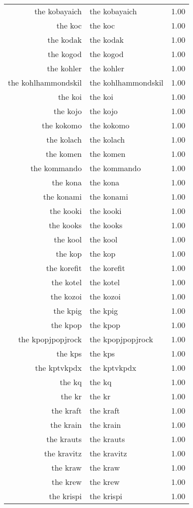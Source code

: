 \begin{table}[ht]
\begin{tabular}{rlr}
  the kobayaich & the kobayaich & 1.00 \\ 
  the koc & the koc & 1.00 \\ 
  the kodak & the kodak & 1.00 \\ 
  the kogod & the kogod & 1.00 \\ 
  the kohler & the kohler & 1.00 \\ 
  the kohlhammondskil & the kohlhammondskil & 1.00 \\ 
  the koi & the koi & 1.00 \\ 
  the kojo & the kojo & 1.00 \\ 
  the kokomo & the kokomo & 1.00 \\ 
  the kolach & the kolach & 1.00 \\ 
  the komen & the komen & 1.00 \\ 
  the kommando & the kommando & 1.00 \\ 
  the kona & the kona & 1.00 \\ 
  the konami & the konami & 1.00 \\ 
  the kooki & the kooki & 1.00 \\ 
  the kooks & the kooks & 1.00 \\ 
  the kool & the kool & 1.00 \\ 
  the kop & the kop & 1.00 \\ 
  the korefit & the korefit & 1.00 \\ 
  the kotel & the kotel & 1.00 \\ 
  the kozoi & the kozoi & 1.00 \\ 
  the kpig & the kpig & 1.00 \\ 
  the kpop & the kpop & 1.00 \\ 
  the kpopjpopjrock & the kpopjpopjrock & 1.00 \\ 
  the kps & the kps & 1.00 \\ 
  the kptvkpdx & the kptvkpdx & 1.00 \\ 
  the kq & the kq & 1.00 \\ 
  the kr & the kr & 1.00 \\ 
  the kraft & the kraft & 1.00 \\ 
  the krain & the krain & 1.00 \\ 
  the krauts & the krauts & 1.00 \\ 
  the kravitz & the kravitz & 1.00 \\ 
  the kraw & the kraw & 1.00 \\ 
  the krew & the krew & 1.00 \\ 
  the krispi & the krispi & 1.00 \\ 

\end{tabular}
\end{table}
